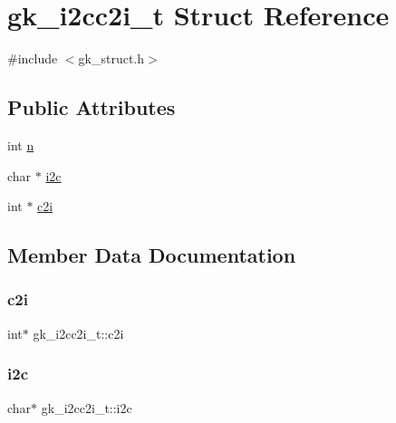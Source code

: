 \hypertarget{structgk__i2cc2i__t}{}\section{gk\+\_\+i2cc2i\+\_\+t Struct Reference}
\label{structgk__i2cc2i__t}


{\ttfamily \#include $<$gk\+\_\+struct.\+h$>$}

\subsection*{Public Attributes}
\begin{DoxyCompactItemize}
\item 
int \hyperlink{structgk__i2cc2i__t_a6438cb03410948dfd033854f1c309817}{n}
\item 
char $\ast$ \hyperlink{structgk__i2cc2i__t_a77a49ab7f70200fbb824d61f0ac5cbe3}{i2c}
\item 
int $\ast$ \hyperlink{structgk__i2cc2i__t_aa1c6f6c0f0b2f7008684efa488dc2e93}{c2i}
\end{DoxyCompactItemize}


\subsection{Member Data Documentation}
\mbox{\label{structgk__i2cc2i__t_aa1c6f6c0f0b2f7008684efa488dc2e93}} 
\subsubsection{\texorpdfstring{c2i}{c2i}}
{\footnotesize\ttfamily int$\ast$ gk\+\_\+i2cc2i\+\_\+t\+::c2i}

\mbox{\label{structgk__i2cc2i__t_a77a49ab7f70200fbb824d61f0ac5cbe3}} 
\subsubsection{\texorpdfstring{i2c}{i2c}}
{\footnotesize\ttfamily char$\ast$ gk\+\_\+i2cc2i\+\_\+t\+::i2c}

\mbox{\label{structgk__i2cc2i__t_a6438cb03410948dfd033854f1c309817}} 
